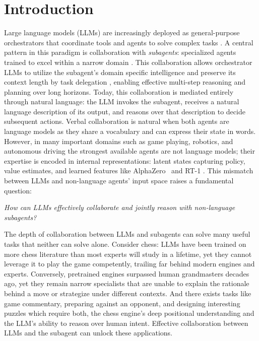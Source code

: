 \section{Introduction}
Large language models (LLMs) are increasingly deployed as general-purpose orchestrators that coordinate tools and agents to solve complex tasks \citep{hong_metagpt_2024, tran_multi-agent_2025}.
A central pattern in this paradigm is collaboration with \emph{subagents}: specialized agents trained to excel within a narrow domain \citep{anthropic_claude_subagents_2025,openai_codex_subagents_2025}.
This collaboration allows orchestrator LLMs to utilize the subagent's domain specific intelligence \citep{hong_metagpt_2024} and preserve its context length by task delegation \citep{zhang_chain_2024}, enabling effective multi-step reasoning and planning over long horizons.
Today, this collaboration is mediated entirely through natural language: the LLM invokes the subagent, receives a natural language description of its output, and reasons over that description to decide subsequent actions\citep{tran_multi-agent_2025}. 
Verbal collaboration is natural when both agents are language models as they share a vocabulary and can express their state in words.
However, in many important domains such as game playing, robotics, and autonomous driving the strongest available agents are not language models; their expertise is encoded in internal representations: latent states capturing policy, value estimates, and learned features like AlphaZero~\citep{silver2017mastering} and RT-1 \citep{brohan2022rt}.
This mismatch between LLMs and non-language agents' input space raises a fundamental question: 
\begin{quoting}
\centering\emph{How can LLMs effectively collaborate and jointly reason with non-language subagents?}
\end{quoting}

The depth of collaboration between LLMs and subagents can solve many useful tasks that neither can solve alone.
Consider chess: LLMs have been trained on more chess literature than most experts will study in a lifetime, yet they cannot leverage it to play the game competently, trailing far behind modern engines and experts.
Conversely, pretrained engines surpassed human grandmasters decades ago\citep{campbell2002deep}, yet they remain narrow specialists that are unable to explain the rationale behind a move or strategize under different contexts.
And there exists tasks like game commentary, preparing against an opponent, and designing interesting puzzles which require both, the chess engine's deep positional understanding and the LLM's ability to reason over human intent. Effective collaboration between LLMs and the subagent can unlock these applications. 

